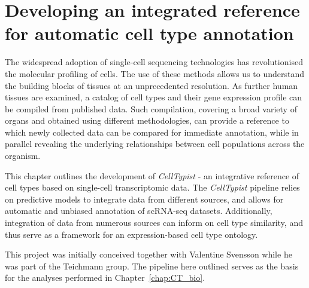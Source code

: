 \chapter{Developing an integrated reference for automatic cell type annotation} \label{chap:CT_method}

\ifpdf
    \graphicspath{{Chapter3/Figs/Raster/}{Chapter3/Figs/PDF/}{Chapter3/Figs/}}
\else
    \graphicspath{{Chapter3/Figs/Vector/}{Chapter3/Figs/}}
\fi
The widespread adoption of single-cell sequencing technologies has revolutionised the molecular profiling of cells. The use of these methods allows us to understand the building blocks of tissues at an unprecedented resolution. As further human tissues are examined, a catalog of cell types and their gene expression profile can be compiled from published data. Such compilation, covering a broad variety of organs and obtained using different methodologies, can provide a reference to which newly collected data can be compared for immediate annotation, while in parallel revealing the underlying relationships between cell populations across the organism.

This chapter outlines the development of \textit{CellTypist} - an integrative reference of cell types based on single-cell transcriptomic data. The \textit{CellTypist} pipeline relies on predictive models to integrate data from different sources, and allows for automatic and unbiased annotation of scRNA-seq datasets. Additionally, integration of data from numerous sources can inform on cell type similarity, and thus serve as a framework for an expression-based cell type ontology.

This project was initially conceived together with Valentine Svensson while he was part of the Teichmann group. The pipeline here outlined serves as the basis for the analyses performed in Chapter~\ref{chap:CT_bio}.


